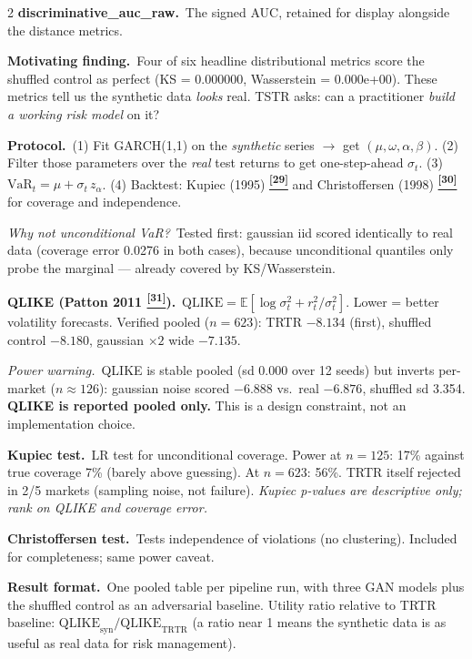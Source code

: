 \documentclass[10pt]{article}
\newcommand{\navybox}[2]{\begin{tcolorbox}[mybox={Navy}{LBg},title={#1}]#2\end{tcolorbox}}
\newcommand{\tcite}[1]{%
  \hyperlink{R:#1}{\textsuperscript{\scriptsize\textbf{[#1]}}}}
\begin{document}
\begin{multicols}{2}
{\smallskip
\textbf{discriminative\_auc\_raw.}\ The signed AUC, retained for display alongside the distance metrics.}

\columnbreak

\navybox{\textbf{Downstream Utility} --- Train-Synthetic Test-Real (TSTR)}{%
\textbf{Motivating finding.}\ Four of six headline distributional metrics score the shuffled control as perfect (KS = 0.000000, Wasserstein = 0.000e+00). These metrics tell us the synthetic data \emph{looks} real. TSTR asks: can a practitioner \emph{build a working risk model} on it?

\smallskip
\textbf{Protocol.}\ (1) Fit GARCH(1,1) on the \emph{synthetic} series $\to$ get $(\mu, \omega, \alpha, \beta)$. (2) Filter those parameters over the \emph{real} test returns to get one-step-ahead $\sigma_t$. (3) $\text{VaR}_t = \mu + \sigma_t\,z_\alpha$. (4) Backtest: Kupiec (1995)\tcite{29} and Christoffersen (1998)\tcite{30} for coverage and independence.

\textit{Why not unconditional VaR?}\ Tested first: gaussian iid scored identically to real data (coverage error 0.0276 in both cases), because unconditional quantiles only probe the marginal --- already covered by KS/Wasserstein.

\smallskip
\textbf{QLIKE (Patton 2011\tcite{31}).}\ $\text{QLIKE} = \mathbb{E}[\log\sigma_t^2 + r_t^2/\sigma_t^2]$. Lower = better volatility forecasts. Verified pooled ($n=623$): TRTR $-8.134$ (first), shuffled control $-8.180$, gaussian $\times2$ wide $-7.135$.

\textit{Power warning.}\ QLIKE is stable pooled (sd 0.000 over 12 seeds) but inverts per-market ($n\approx126$): gaussian noise scored $-6.888$ vs.\ real $-6.876$, shuffled sd 3.354. \textbf{QLIKE is reported pooled only.} This is a design constraint, not an implementation choice.

\smallskip
\textbf{Kupiec test.}\ LR test for unconditional coverage. Power at $n=125$: 17\% against true coverage 7\% (barely above guessing). At $n=623$: 56\%. TRTR itself rejected in 2/5 markets (sampling noise, not failure). \textit{Kupiec p-values are descriptive only; rank on QLIKE and coverage error.}

\smallskip
\textbf{Christoffersen test.}\ Tests independence of violations (no clustering). Included for completeness; same power caveat.

\smallskip
\textbf{Result format.}\ One pooled table per pipeline run, with three GAN models plus the shuffled control as an adversarial baseline. Utility ratio relative to TRTR baseline: $\text{QLIKE}_\text{syn}/\text{QLIKE}_\text{TRTR}$ (a ratio near 1 means the synthetic data is as useful as real data for risk management).}

\end{multicols}
\end{document}
